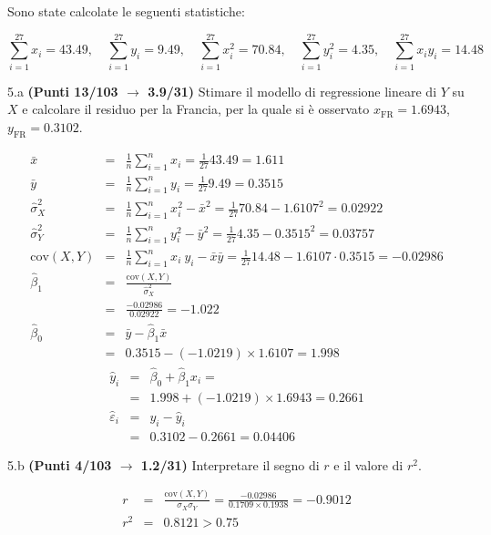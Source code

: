 \documentclass[
  11pt,
]{book}
\theoremstyle{mytheoremstyle}
\theoremstyle{mydefstyle}
\begin{document}
Sono state calcolate le seguenti statistiche:

\[
\sum_{i=1}^{27}  x_i = 43.49,\quad \sum_{i=1}^{27}  y_i = 9.49,\quad \sum_{i=1}^{27}  x_i^2 = 70.84,\quad \sum_{i=1}^{27}  y_i^2 = 4.35,\quad \sum_{i=1}^{27}  x_iy_i = 14.48
\]

5.a \textbf{(Punti 13/103 \(\rightarrow\) 3.9/31)} Stimare il modello di regressione lineare di \(Y\) su \(X\) e calcolare il residuo per la Francia, per la quale si è osservato \(x_{\text{FR}} = 1.6943\), \(y_{\text{FR}} = 0.3102\).

\begin{eqnarray*}
           \bar x &=&\frac 1 n\sum_{i=1}^n x_i = \frac {1}{ 27 }  43.49 =  1.611 \\
           \bar y &=&\frac 1 n\sum_{i=1}^n y_i = \frac {1}{ 27 }  9.49 =  0.3515 \\
           \hat\sigma_X^2&=&\frac 1 n\sum_{i=1}^n x_i^2-\bar x^2=\frac {1}{ 27 }  70.84  - 1.6107 ^2= 0.02922 \\
           \hat\sigma_Y^2&=&\frac 1 n\sum_{i=1}^n y_i^2-\bar y^2=\frac {1}{ 27 }  4.35  - 0.3515 ^2= 0.03757 \\
           \text{cov}(X,Y)&=&\frac 1 n\sum_{i=1}^n x_i~y_i-\bar x\bar y=\frac {1}{ 27 }  14.48 - 1.6107 \cdot 0.3515 = -0.02986 \\
           \hat\beta_1 &=& \frac{\text{cov}(X,Y)}{\hat\sigma_X^2} \\
                    &=& \frac{ -0.02986 }{ 0.02922 }  =  -1.022 \\
           \hat\beta_0 &=& \bar y - \hat\beta_1 \bar x\\
                    &=&  0.3515 - (-1.0219) \times  1.6107 = 1.998 
         \end{eqnarray*}\begin{eqnarray*}
\hat y_i &=&\hat\beta_0+\hat\beta_1 x_i=\\ 
&=& 1.998 + (-1.0219) \times 1.6943 = 0.2661 \\ 
\hat \varepsilon_i &=& y_i-\hat y_i\\ 
&=& 0.3102 - 0.2661 = 0.04406  
\end{eqnarray*}

5.b \textbf{(Punti 4/103 \(\rightarrow\) 1.2/31)} Interpretare il segno di \(r\) e il valore di \(r^2\).

\begin{eqnarray*}
r&=&\frac{\text{cov}(X,Y)}{\sigma_X\sigma_Y}=\frac{ -0.02986 }{ 0.1709 \times 0.1938 }= -0.9012 \\ 
r^2&=& 0.8121 > 0.75
\end{eqnarray*}
\end{document}
